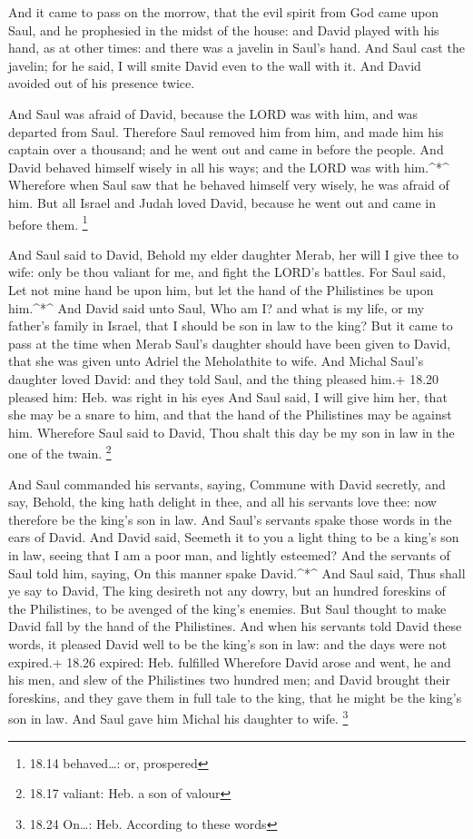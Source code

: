  And it came to pass on the morrow, that the evil spirit
from God came upon Saul, and he prophesied in the midst of the house:
and David played with his hand, as at other times: and there was a
javelin in Saul's hand.  And Saul cast the javelin; for he
said, I will smite David even to the wall with it. And David avoided out
of his presence twice.

 And Saul was afraid of David, because the LORD was with
him, and was departed from Saul.  Therefore Saul removed
him from him, and made him his captain over a thousand; and he went out
and came in before the people.  And David behaved himself
wisely in all his ways; and the LORD was with him.\^{}*\^{}
 Wherefore when Saul saw that he behaved himself very
wisely, he was afraid of him.  But all Israel and Judah
loved David, because he went out and came in before them. \footnote{18.14
  behaved\ldots: or, prospered}

 And Saul said to David, Behold my elder daughter Merab,
her will I give thee to wife: only be thou valiant for me, and fight the
LORD's battles. For Saul said, Let not mine hand be upon him, but let
the hand of the Philistines be upon him.\^{}*\^{}  And
David said unto Saul, Who am I? and what is my life, or my father's
family in Israel, that I should be son in law to the king? 
But it came to pass at the time when Merab Saul's daughter should have
been given to David, that she was given unto Adriel the Meholathite to
wife.  And Michal Saul's daughter loved David: and they
told Saul, and the thing pleased him.+ 18.20 pleased him: Heb. was right
in his eyes  And Saul said, I will give him her, that she
may be a snare to him, and that the hand of the Philistines may be
against him. Wherefore Saul said to David, Thou shalt this day be my son
in law in the one of the twain. \footnote{18.17 valiant: Heb. a son of
  valour}

 And Saul commanded his servants, saying, Commune with
David secretly, and say, Behold, the king hath delight in thee, and all
his servants love thee: now therefore be the king's son in law.
 And Saul's servants spake those words in the ears of
David. And David said, Seemeth it to you a light thing to be a king's
son in law, seeing that I am a poor man, and lightly esteemed?
 And the servants of Saul told him, saying, On this manner
spake David.\^{}*\^{}  And Saul said, Thus shall ye say to
David, The king desireth not any dowry, but an hundred foreskins of the
Philistines, to be avenged of the king's enemies. But Saul thought to
make David fall by the hand of the Philistines.  And when
his servants told David these words, it pleased David well to be the
king's son in law: and the days were not expired.+ 18.26 expired: Heb.
fulfilled  Wherefore David arose and went, he and his men,
and slew of the Philistines two hundred men; and David brought their
foreskins, and they gave them in full tale to the king, that he might be
the king's son in law. And Saul gave him Michal his daughter to wife.
\footnote{18.24 On\ldots: Heb. According to these words}

